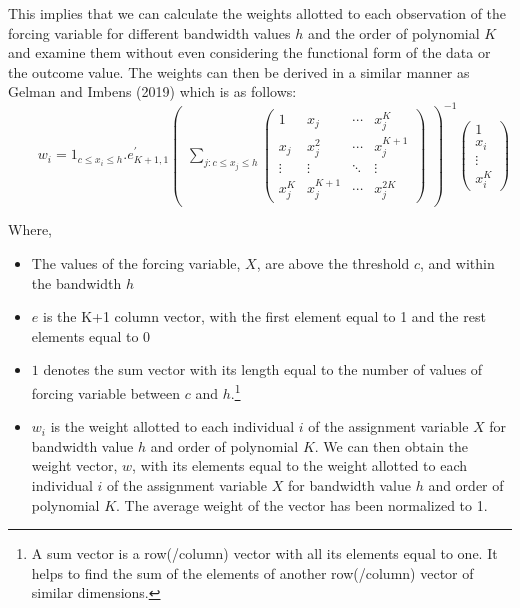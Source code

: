 \documentclass[fleqn]{article}
\begin{document}
    This implies that we can calculate the weights allotted to each observation of the forcing variable for different bandwidth values $h$ and the order of polynomial $K$ and examine them without even considering the functional form of the data or the outcome value. The weights can then be derived in a similar manner as Gelman and Imbens (2019)\cite{gelman2019high} which is as follows:\\
    \begin{equation*} 
        \qquad w_{i} = 1_{c \leq x_{i} \leq h}.e^\prime_{K+1,1}
        \begin{pmatrix}
            \sum_{j:c \leq x_j \leq h}
            \begin{pmatrix}
                1 & x_j & \cdots & x_j^K \\
                x_j & x_j^2 & \cdots & x_j^{K+1} \\
                \vdots & \vdots & \ddots & \vdots \\
                x_j^K & x_j^{K+1} & \cdots & x_j^{2K}
            \end{pmatrix}
        \end{pmatrix}^{-1} 
        \begin{pmatrix}
            1 \\  x_i \\ \vdots \\ x_i^K
        \end{pmatrix}
    \end{equation*}

    Where, 
    \begin{itemize} 
        \item The values of the forcing variable, $X$, are above the threshold $c$, and within the bandwidth $h$
        \item $e$ is the K+1 column vector, with the first element equal to 1 and the rest elements equal to $0$
        \item $1$ denotes the sum vector with its length equal to the number of values of forcing variable between $c$ and $h$.\footnote{A sum vector is a row(/column) vector with all its elements equal to one. It helps to find the sum of the elements of another row(/column) vector of similar dimensions.}
        \item $w_{i}$ is the weight allotted to each individual $i$ of the assignment variable $X$ for bandwidth value $h$ and order of polynomial $K$. We can then obtain the weight vector, $w$, with its elements equal to the weight allotted to each individual $i$ of the assignment variable $X$ for bandwidth value $h$ and order of polynomial $K$. The average weight of the vector has been normalized to 1.
    \end{itemize}
\end{document}
